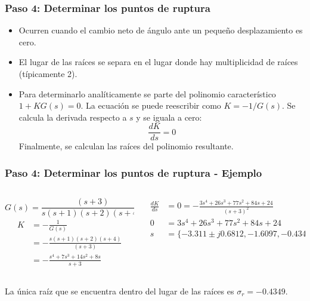 \documentclass[aspectratio=169,handout]{beamer}
\theoremstyle{definition}
\theoremstyle{plain}
\theoremstyle{remark}
\begin{document}
\begin{frame}[c]\frametitle{Paso 4: Determinar los puntos de ruptura}
	\begin{itemize}
		\item Ocurren cuando el cambio neto de ángulo ante un pequeño desplazamiento es cero.
		\item El lugar de las raíces se separa en el lugar donde hay multiplicidad de raíces (típicamente 2).
		\item Para determinarlo analíticamente se parte del polinomio característico $1 + KG(s) = 0$. La ecuación se puede reescribir como $K = -1/G(s)$. Se calcula la derivada respecto a $s$ y se iguala a cero:
		\begin{equation*}
			\frac{dK}{ds} = 0
		\end{equation*}
		Finalmente, se calculan las raíces del polinomio resultante.
	\end{itemize}
\end{frame}

\begin{frame}[c]\frametitle{Paso 4: Determinar los puntos de ruptura - Ejemplo}
\vspace*{5mm}
\begin{columns}
	\begin{column}{0.5\textwidth}
	\begin{equation*}
		G(s) = \frac{(s+3)}{s(s+1)(s+2)(s+4)}
	\end{equation*}
	\begin{align*}
		K &= -\frac{1}{G(s)}\\
		&= -\frac{s(s+1)(s+2)(s+4)}{(s+3)}\\
		&= -\frac{s^4+7s^3 + 14s^2 + 8s}{s+3}
	\end{align*}
	\end{column}
	\begin{column}{0.5\textwidth}
	\begin{align*}
		\frac{dK}{ds} &= 0 = -\frac{3s^4 + 26s^3 + 77s^2 + 84s + 24}{(s+3)^2}\\
		0 &= 3s^4 + 26s^3 + 77s^2 + 84s + 24\\
		s &= \{ -3.311 \pm j0.6812, -1.6097, -0.4349 \}
	\end{align*}
	\end{column}
\end{columns}
\vspace*{5mm}
La única raíz que se encuentra dentro del lugar de las raíces es $\sigma_r = -0.4349$.
\end{frame}
\end{document}
